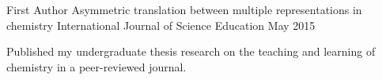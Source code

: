 

\begin{cventries}

  \cventry
    {First Author} %
    {Asymmetric translation between multiple representations in chemistry} %
    {International Journal of Science Education} %
    {May 2015} %
    {
      \begin{cvitems} %
        \item {Published my undergraduate thesis research on the teaching and learning of chemistry in a peer-reviewed journal.}
      \end{cvitems}
    }

\end{cventries}

